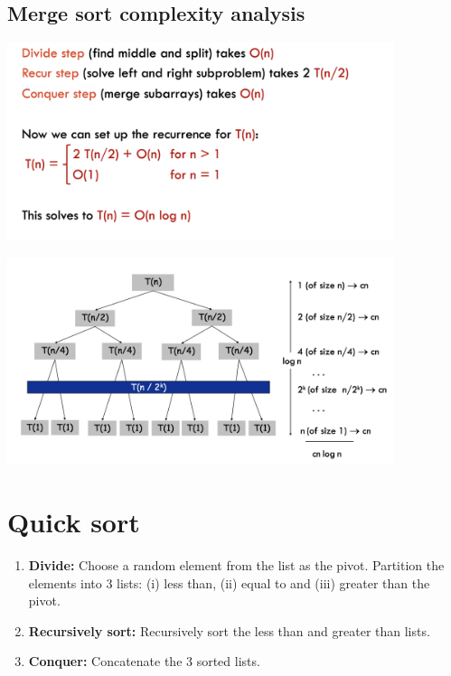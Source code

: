 \documentclass[12pt]{article}
\newcommand{\1}{\space \quad}
\newcommand{\2}{\quad \quad \quad}
\newcommand{\3}{\quad \quad \quad \quad \space}
\newcommand{\4}{\quad \quad \quad \quad \quad \quad}
\newcommand{\5}{\quad \quad \quad \quad \quad \quad \quad \space}
\begin{document}
\subsection{Merge sort complexity analysis}
\includegraphics[width=0.85\textwidth]{image33.png} 

\includegraphics[width=0.85\textwidth]{image34.png} 

\section{Quick sort}
\begin{enumerate}
  \item \textbf{Divide:} Choose a random element from the list as the pivot. Partition the elements into 
  3 lists: (i) less than, (ii) equal to and (iii) greater than the pivot.
  \item \textbf{Recursively sort:} Recursively sort the less than and greater than lists.
  \item \textbf{Conquer:} Concatenate the 3 sorted lists.
\end{enumerate}
\end{document}
